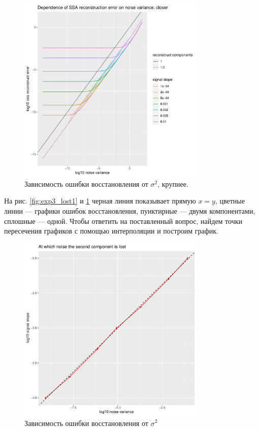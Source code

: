 \documentclass[specialist, substylefile = spbureport.rtx,
    subf,href,colorlinks=true, 12pt]{disser}
\begin{document}
        \begin{figure}[h]
            \centering
            \includegraphics[width=0.8\textwidth]{experiment_3_lost2.pdf}
            \caption{Зависимость ошибки восстановления от $\sigma^2$, крупнее.}
            \label{fig:exp3_lost2}
        \end{figure}

        На рис. \ref{fig:exp3_lost1} и \ref{fig:exp3_lost2} черная линия показывает прямую $x = y$, цветные линии --- графики ошибок восстановления, пунктирные --- двумя компонентами, сплошные --- одной. Чтобы ответить на поставленный вопрос, найдем точки пересечения графиков с помощью интерполяции и построим график.

        \begin{figure}[h]
            \centering
            \includegraphics[width=0.8\textwidth]{experiment_3_lost3.pdf}
            \caption{Зависимость ошибки восстановления от $\sigma^2$}
            \label{fig:exp3_lost3}
        \end{figure}
\end{document}
